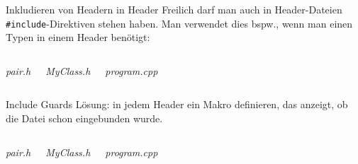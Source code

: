 \begin{frame}[fragile]{Inkludieren von Headern in Header}
	Freilich darf man auch in Header-Dateien \verb|#include|-Direktiven stehen haben. Man verwendet dies bspw., wenn man einen Typen in einem Header benötigt:
	
	\vspace{2em}
	
	\footnotesize
	\begin{columns}[t]
		\emph{pair.h}
		\vspace{0.5em}
		
		
		{
			\emph{MyClass.h}
			\vspace{0.5em}
			
		}
		
		{
			\emph{program.cpp}
			\vspace{0.5em}
			
		}
	\end{columns}
\end{frame}

\begin{frame}{Include Guards}
	Lösung: in jedem Header ein Makro definieren, das anzeigt, ob die Datei schon eingebunden wurde.
	
	\vspace{1em}
	
	\footnotesize
	\begin{columns}[t]
		\emph{pair.h}
		\vspace{0.5em}
		
		
		{
			\emph{MyClass.h}
			\vspace{0.5em}
			
		}
		
		{
			\emph{program.cpp}
			\vspace{0.5em}
			
		}
	\end{columns}
\end{frame}
